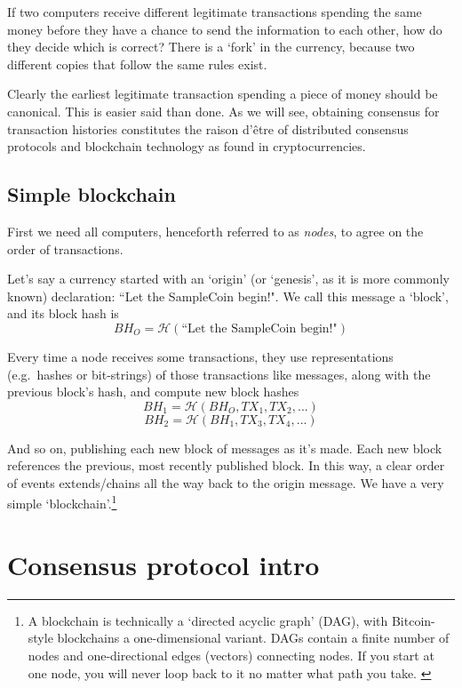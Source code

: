 If two computers receive different legitimate transactions spending the same money before they have a chance to send the information to each other, how do they decide which is correct? There is a `fork' in the currency, because two different copies that follow the same rules exist.

Clearly the earliest legitimate transaction spending a piece of money should be canonical. This is easier said than done. As we will see, obtaining consensus for transaction histories constitutes the raison d'\^{e}tre of distributed consensus protocols and blockchain technology as found in cryptocurrencies.


\subsection{Simple blockchain}
\label{subsec:simple-blockchain}

First we need all computers, henceforth referred to as {\em nodes}, to agree on the order of transactions.

Let's say a currency started with an `origin' (or `genesis', as it is more commonly known) declaration: ``Let the SampleCoin begin!". We call this message a `block', and its block hash is\vspace{.175cm}
\[\mathit{BH}_O = \mathcal{H}(\textrm{``Let the SampleCoin begin!"})\]

Every time a node receives some transactions, they use representations (e.g.\ hashes or bit-strings) of those transactions like messages, along with the previous block's hash, and compute new block hashes\vspace{.175cm}
\[\mathit{BH}_1 = \mathcal{H}(\mathit{BH}_O, \mathit{TX}_1, \mathit{TX}_2,...)\]
\[\mathit{BH}_2 = \mathcal{H}(\mathit{BH}_1, \mathit{TX}_3, \mathit{TX}_4,...)\]

And so on, publishing each new block of messages as it's made. Each new block references the previous, most recently published block. In this way, a clear order of events extends/chains all the way back to the origin message. We have a very simple `blockchain'.\footnote{A blockchain is technically a `directed acyclic graph' (DAG), with Bitcoin-style blockchains a one-dimensional variant. DAGs contain a finite number of nodes and one-directional edges (vectors) connecting nodes. If you start at one node, you will never loop back to it no matter what path you take. \cite{DAG-wikipedia}}



\section{Consensus protocol intro}
\label{sec:consensus-protocol-intro}

